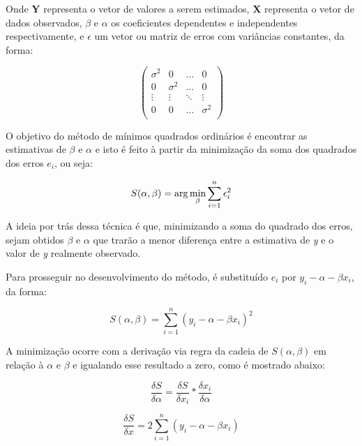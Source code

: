 Onde \textbf{Y} representa o vetor de valores a serem estimados, \textbf{X} representa o vetor de dados observados, $\beta$ e $\alpha$ os coeficientes dependentes e independentes respectivamente, e $\epsilon$ um vetor ou matriz de erros com variâncias constantes, da forma:

\begin{equation*} \left(\begin{array}{cccc} \sigma^{2} & 0 & \ldots & 0 \\ 0 & \sigma^{2} & \ldots & 0 \\ \vdots & \vdots & \ddots & \vdots \\ 0 & 0 & \ldots & \sigma^{2} \\ \end{array} \right) \end{equation*}

O objetivo do método de mínimos quadrados ordinários é encontrar as estimativas de $\beta$ e $\alpha$ e isto é feito à partir da minimização da soma dos quadrados dos erros $e_i$, ou seja:

\begin{equation}\label{eq:2}
S(\alpha, \beta) =\arg\min_{\beta}\sum_{i=1}^{n}\epsilon_{i}^{2}\\ 
\end{equation}

A ideia por trás dessa técnica é que, minimizando a soma do quadrado dos erros, sejam obtidos $\beta$ e $\alpha$ que trarão a menor diferença entre a estimativa de \textit{y}  e o valor de \textit{y} realmente observado. 

Para prosseguir no desenvolvimento do método, é substituído $e_i$ por $y_i - \alpha - \beta x_i$, da forma:

\begin{equation}\label{eq:3}
S(\alpha, \beta) = \sum_{i=1}^{n} (y_i - \alpha - \beta x_i)^2
\end{equation}

A minimização ocorre com a derivação via regra da cadeia de $S(\alpha, \beta)$ em relação à $\alpha$ e $\beta$ e igualando esse resultado a zero, como é mostrado abaixo:

\begin{equation*} 
\frac{\delta S}{\delta \alpha} = \frac{\delta S}{\delta x_i} \ast \frac{\delta x_i}{\delta \alpha}
\end{equation*}

\begin{equation*}
\frac{\delta S}{\delta x} = 2 \sum_{i=1}^{n} (y_i - \alpha - \beta x_i)
\end{equation*}

